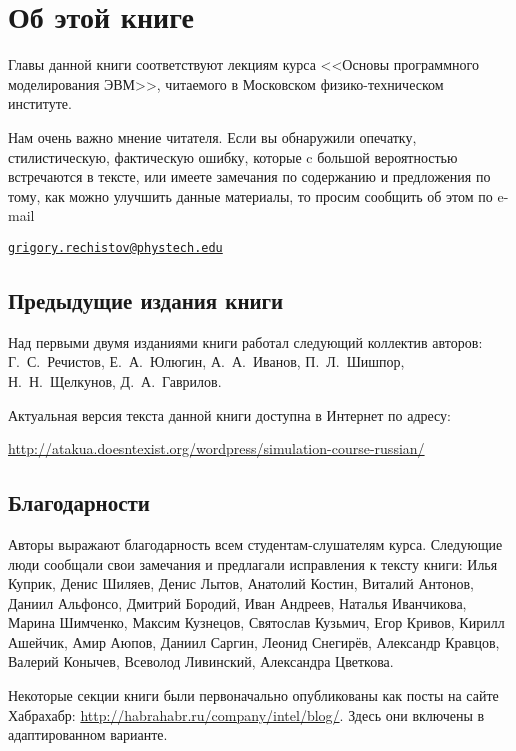 \chapter*{Об этой книге}\label{chap:contrib}

Главы данной книги соответствуют лекциям курса <<Основы программного моделирования ЭВМ>>, читаемого в Московском физико-техническом институте.

Нам очень важно мнение читателя. Если вы обнаружили опечатку, стилистическую, фактическую ошибку, которые c большой вероятностью встречаются в тексте, или имеете замечания по содержанию и предложения по тому, как можно улучшить данные материалы, то просим сообщить об этом по e-mail 

\begin{center}
\href{mailto:grigory.rechistov@phystech.edu}{\texttt{grigory.rechistov@phystech.edu}}
\end{center}


\section*{Предыдущие издания книги}

Над первыми двумя изданиями книги работал следующий коллектив авторов: Г.~С.~Речистов, Е.~А.~Юлюгин, А.~А.~Иванов, П.~Л.~Шишпор, Н.~Н.~Щелкунов, Д.~А.~Гаврилов.

Актуальная версия текста данной книги доступна в Интернет по адресу:

{\scriptsize\url{http://atakua.doesntexist.org/wordpress/simulation-course-russian/}}

\section*{Благодарности}


Авторы выражают благодарность всем студентам-слушателям курса. Следующие люди сообщали свои замечания и предлагали исправления к тексту книги: Илья Куприк, Денис Шиляев, Денис Лытов, Анатолий Костин, Виталий Антонов, Даниил Альфонсо, Дмитрий Бородий, Иван Андреев, Наталья Иванчикова, Марина Шимченко, Максим Кузнецов, Святослав Кузьмич, Егор Кривов, Кирилл Ашейчик, Амир Аюпов, Даниил Саргин, Леонид Снегирёв, Александр Кравцов, Валерий Конычев, Всеволод Ливинский, Александра Цветкова.

Некоторые секции книги были первоначально опубликованы как посты на сайте Хабрахабр: \url{http://habrahabr.ru/company/intel/blog/}. Здесь они включены в адаптированном варианте.


